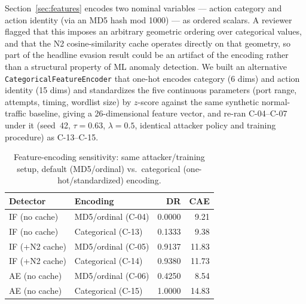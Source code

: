 \documentclass[sigconf]{acmart}
\begin{document}
Section~\ref{sec:features} encodes two nominal variables --- action
category and action identity (via an MD5 hash mod 1000) --- as ordered
scalars. A reviewer flagged that this imposes an arbitrary geometric
ordering over categorical values, and that the N2 cosine-similarity
cache operates directly on that geometry, so part of the headline
evasion result could be an artifact of the encoding rather than a
structural property of ML anomaly detection. We built an alternative
\texttt{CategoricalFeatureEncoder} that one-hot encodes category (6
dims) and action identity (15 dims) and standardizes the five
continuous parameters (port range, attempts, timing, wordlist size) by
$z$-score against the same synthetic normal-traffic baseline, giving a
26-dimensional feature vector, and re-ran C-04--C-07 under it (seed~42,
$\tau=0.63$, $\lambda=0.5$, identical attacker policy and training
procedure) as C-13--C-15.

\begin{table}[t]
\caption{Feature-encoding sensitivity: same attacker/training setup,
default (MD5/ordinal) vs.\ categorical (one-hot/standardized) encoding.}
\label{tab:encoding}
\centering
\small
\begin{tabular}{l l r r}
\toprule
Detector & Encoding & DR & CAE \\
\midrule
IF (no cache)  & MD5/ordinal (C-04)  & 0.0000 &  9.21 \\
IF (no cache)  & Categorical (C-13)  & 0.1333 &  9.38 \\
IF (+N2 cache) & MD5/ordinal (C-05)  & 0.9137 & 11.83 \\
IF (+N2 cache) & Categorical (C-14)  & 0.9380 & 11.73 \\
AE (no cache)  & MD5/ordinal (C-06)  & 0.4250 &  8.54 \\
AE (no cache)  & Categorical (C-15)  & 1.0000 & 14.83 \\
\bottomrule
\end{tabular}
\end{table}
\end{document}
